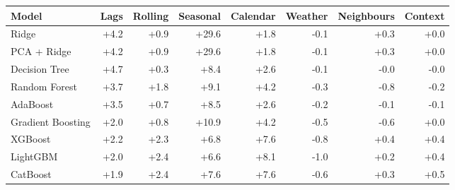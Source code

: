 \begin{tabular}{lrrrrrrr}
\toprule
Model & Lags & Rolling & Seasonal & Calendar & Weather & Neighbours & Context \\
\midrule
Ridge & +4.2 & +0.9 & +29.6 & +1.8 & -0.1 & +0.3 & +0.0 \\
PCA + Ridge & +4.2 & +0.9 & +29.6 & +1.8 & -0.1 & +0.3 & +0.0 \\
Decision Tree & +4.7 & +0.3 & +8.4 & +2.6 & -0.1 & -0.0 & -0.0 \\
Random Forest & +3.7 & +1.8 & +9.1 & +4.2 & -0.3 & -0.8 & -0.2 \\
AdaBoost & +3.5 & +0.7 & +8.5 & +2.6 & -0.2 & -0.1 & -0.1 \\
Gradient Boosting & +2.0 & +0.8 & +10.9 & +4.2 & -0.5 & -0.6 & +0.0 \\
XGBoost & +2.2 & +2.3 & +6.8 & +7.6 & -0.8 & +0.4 & +0.4 \\
LightGBM & +2.0 & +2.4 & +6.6 & +8.1 & -1.0 & +0.2 & +0.4 \\
CatBoost & +1.9 & +2.4 & +7.6 & +7.6 & -0.6 & +0.3 & +0.5 \\
\bottomrule
\end{tabular}
